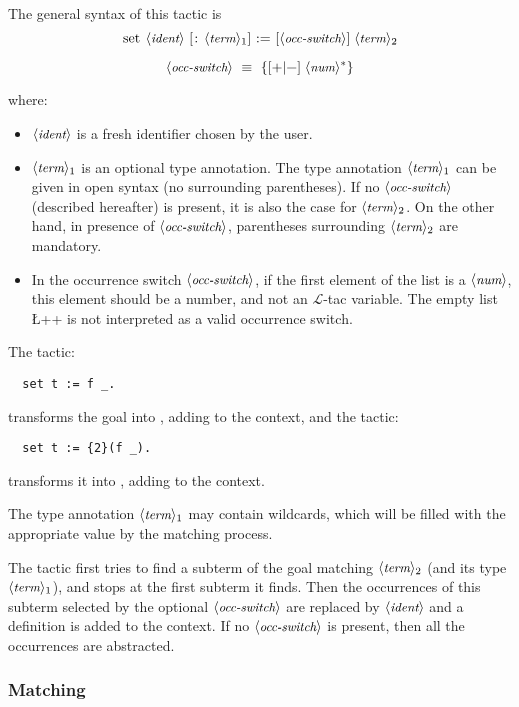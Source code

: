 The general syntax of this tactic is
\[\C{set}\ \N{ident}\ [\C{:}\ \N{term}_1]\ \C{:=}\ [\N{occ-switch}]\;\N{term}_2\]

\[\N{occ-switch}\ \equiv\ \C{\{}[\C{+}|\C{-}]\;\N{num}^*\C{\}}\]


where:

\begin{itemize}
\item $\langle\mbox{\itshape\rmfamily\small ident}\rangle$ is a fresh identifier chosen by the user.
\item $\langle\mbox{\itshape\rmfamily\small term}\rangle_1$ is 
an optional type annotation. The type annotation $\langle\mbox{\itshape\rmfamily\small term}\rangle_1$ can be
given in open syntax (no surrounding parentheses). If no $\langle\mbox{\itshape\rmfamily\small occ-switch}\rangle$ 
(described hereafter) is present, it is also
the case for $\langle\mbox{\itshape\rmfamily\small term}\rangle_2$.
On the other hand, in  presence of $\langle\mbox{\itshape\rmfamily\small occ-switch}\rangle$, parentheses
surrounding $\langle\mbox{\itshape\rmfamily\small term}\rangle_2$ are mandatory.
\item In the occurrence switch $\langle\mbox{\itshape\rmfamily\small occ-switch}\rangle$, if the first element
  of the list is a $\langle\mbox{\itshape\rmfamily\small num}\rangle$, this element should be a number, and not
  an $\mathcal{L}$-tac variable. The empty list \L+{}+ is not interpreted as a
  valid occurrence switch.
\end{itemize}

The tactic:
\begin{lstlisting}
  set t := f _.
\end{lstlisting}
transforms the goal  into , adding
 to the context, and the tactic:
\begin{lstlisting}
  set t := {2}(f _).
\end{lstlisting}
transforms it into , adding  to the context.

The type annotation $\langle\mbox{\itshape\rmfamily\small term}\rangle_1$ may
contain wildcards, which will be filled with the appropriate value by
the matching process.

The tactic first tries to find a subterm of the goal matching
$\langle\mbox{\itshape\rmfamily\small term}\rangle_2$ (and its type $\langle\mbox{\itshape\rmfamily\small term}\rangle_1$),
and stops at the first subterm it finds. Then the occurrences
of this subterm selected by the optional $\langle\mbox{\itshape\rmfamily\small occ-switch}\rangle$ are replaced
by $\langle\mbox{\itshape\rmfamily\small ident}\rangle$ and a definition  is added to
the context. If no $\langle\mbox{\itshape\rmfamily\small occ-switch}\rangle$ is present, then all the
occurrences are abstracted.

\subsubsection*{Matching}

